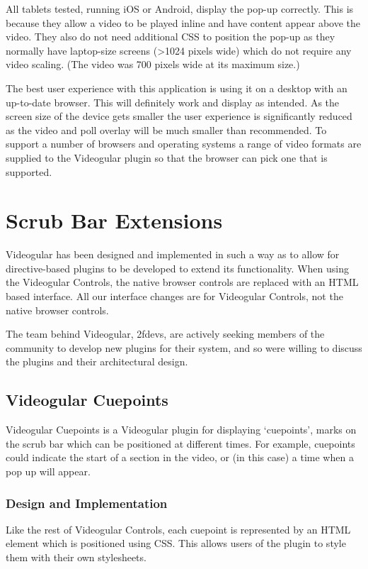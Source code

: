 All tablets tested, running iOS or Android, display the pop-up correctly. This is because they allow a video to be played inline and have content appear above the video. They also do not need additional \gls{CSS} to position the pop-up as they normally have laptop-size screens (\textgreater 1024 pixels wide) which do not require any video scaling. (The video was 700 pixels wide at its maximum size.)

The best user experience with this application is using it on a desktop with an up-to-date browser. This will definitely work and display as intended. As the screen size of the device gets smaller the user experience is significantly reduced as the video and poll overlay will be much smaller than recommended. To support a number of browsers and operating systems a range of video formats are supplied to the \gls{Videogular} plugin so that the browser can pick one that is supported.

\section{Scrub Bar Extensions}
\label{Section:Scrub Bar Extensions}

\gls{Videogular} has been designed and implemented in such a way as to allow for directive-based plugins to be developed to extend its functionality. When using the \gls{Videogular} Controls, the native browser controls are replaced with an HTML based interface. All our interface changes are for \gls{Videogular} Controls, not the native browser controls.

The team behind \gls{Videogular}, 2fdevs, are actively seeking members of the community to develop new plugins for their system, and so were willing to discuss the plugins and their architectural design.

\subsection{Videogular Cuepoints}
\label{Subsection:vgCuepoints}
\gls{Videogular} Cuepoints is a \gls{Videogular} plugin for displaying `cuepoints', marks on the scrub bar which can be positioned at different times. For example, cuepoints could indicate the start of a section in the video, or (in this case) a time when a pop up will appear.

\subsubsection{Design and Implementation}
Like the rest of Videogular Controls, each cuepoint is represented by an HTML element which is positioned using \gls{CSS}. This allows users of the plugin to style them with their own stylesheets.

